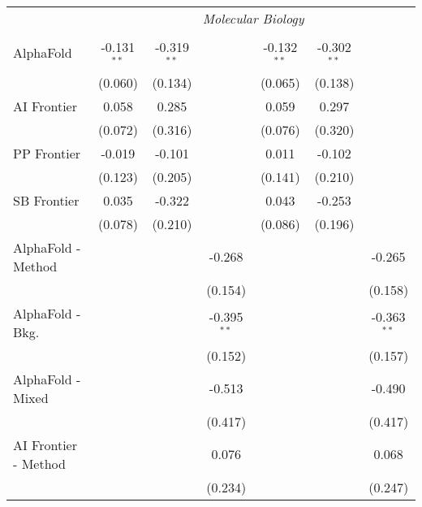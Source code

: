 \begin{tabular}{lcccccc}
 & \multicolumn{6}{c}{\textit{Molecular Biology}} \\ \\
   AlphaFold            & -0.131$^{**}$ & -0.319$^{**}$ &               & -0.132$^{**}$ & -0.302$^{**}$ &   \\   
                        & (0.060)       & (0.134)       &               & (0.065)       & (0.138)       &   \\   
   AI Frontier          & 0.058         & 0.285         &               & 0.059         & 0.297         &   \\   
                        & (0.072)       & (0.316)       &               & (0.076)       & (0.320)       &   \\   
   PP Frontier          & -0.019        & -0.101        &               & 0.011         & -0.102        &   \\   
                        & (0.123)       & (0.205)       &               & (0.141)       & (0.210)       &   \\   
   SB Frontier          & 0.035         & -0.322        &               & 0.043         & -0.253        &   \\   
                        & (0.078)       & (0.210)       &               & (0.086)       & (0.196)       &   \\   
   AlphaFold - Method   &               &               & -0.268        &               &               & -0.265\\   
                        &               &               & (0.154)       &               &               & (0.158)\\   
   AlphaFold - Bkg.     &               &               & -0.395$^{**}$ &               &               & -0.363$^{**}$\\   
                        &               &               & (0.152)       &               &               & (0.157)\\   
   AlphaFold - Mixed    &               &               & -0.513        &               &               & -0.490\\   
                        &               &               & (0.417)       &               &               & (0.417)\\   
   AI Frontier - Method &               &               & 0.076         &               &               & 0.068\\   
                        &               &               & (0.234)       &               &               & (0.247)\\   

\end{tabular}
